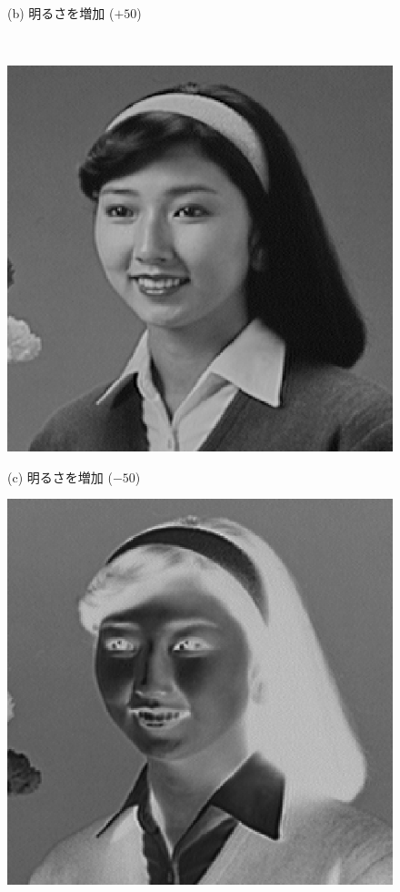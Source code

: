 \begin{figure}[b]
\begin{center}
\begin{minipage}{.38\textwidth}
\begin{center}
(b) 明るさを増加 ($+50$)
\end{center}
\end{minipage}\\[.5\baselineskip]
\begin{minipage}{.38\textwidth}
\begin{center}
\includegraphics[width=.98\textwidth]{fig/hair1_m50.eps}

(c) 明るさを増加 ($-50$)
\end{center}
\end{minipage}
\begin{minipage}{.38\textwidth}
\begin{center}
\includegraphics[width=.98\textwidth]{fig/hair1_np.eps}


\end{center}
\end{minipage}
\end{center}
\end{figure}
